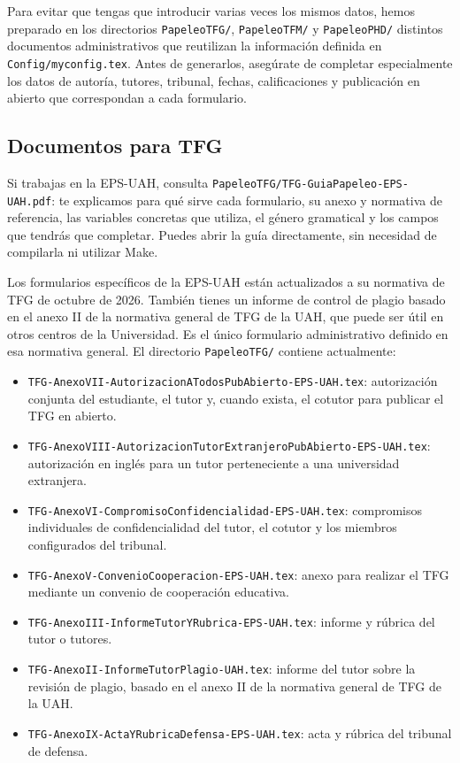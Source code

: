 Para evitar que tengas que introducir varias veces los mismos datos, hemos preparado en los directorios \texttt{PapeleoTFG/}, \texttt{PapeleoTFM/} y \texttt{PapeleoPHD/} distintos documentos administrativos que reutilizan la información definida en \texttt{Config/myconfig.tex}. Antes de generarlos, asegúrate de completar especialmente los datos de autoría, tutores, tribunal, fechas, calificaciones y publicación en abierto que correspondan a cada formulario.

\subsection{Documentos para TFG}

Si trabajas en la EPS-UAH, consulta \texttt{PapeleoTFG/TFG-GuiaPapeleo-EPS-UAH.pdf}: te explicamos para qué sirve cada formulario, su anexo y normativa de referencia, las variables concretas que utiliza, el género gramatical y los campos que tendrás que completar. Puedes abrir la guía directamente, sin necesidad de compilarla ni utilizar Make.

Los formularios específicos de la EPS-UAH están actualizados a su normativa de TFG de octubre de 2026. También tienes un informe de control de plagio basado en el anexo II de la normativa general de TFG de la UAH, que puede ser útil en otros centros de la Universidad. Es el único formulario administrativo definido en esa normativa general. El directorio \texttt{PapeleoTFG/} contiene actualmente:

\begin{itemize}
  \item \texttt{TFG-AnexoVII-AutorizacionATodosPubAbierto-EPS-UAH.tex}: autorización conjunta del estudiante, el tutor y, cuando exista, el cotutor para publicar el TFG en abierto.
  \item \texttt{TFG-AnexoVIII-AutorizacionTutorExtranjeroPubAbierto-EPS-UAH.tex}: autorización en inglés para un tutor perteneciente a una universidad extranjera.
  \item \texttt{TFG-AnexoVI-CompromisoConfidencialidad-EPS-UAH.tex}: compromisos individuales de confidencialidad del tutor, el cotutor y los miembros configurados del tribunal.
  \item \texttt{TFG-AnexoV-ConvenioCooperacion-EPS-UAH.tex}: anexo para realizar el TFG mediante un convenio de cooperación educativa.
  \item \texttt{TFG-AnexoIII-InformeTutorYRubrica-EPS-UAH.tex}: informe y rúbrica del tutor o tutores.
  \item \texttt{TFG-AnexoII-InformeTutorPlagio-UAH.tex}: informe del tutor sobre la revisión de plagio, basado en el anexo II de la normativa general de TFG de la UAH.
  \item \texttt{TFG-AnexoIX-ActaYRubricaDefensa-EPS-UAH.tex}: acta y rúbrica del tribunal de defensa.
\end{itemize}


